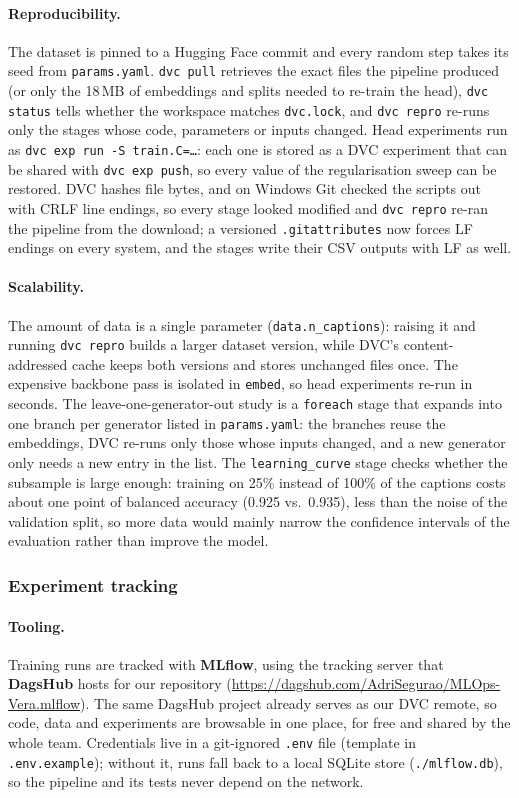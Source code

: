 \documentclass[11pt]{article}
\begin{document}
\paragraph{Reproducibility.} The dataset is pinned to a Hugging Face commit and every random step takes its seed from \texttt{params.yaml}. \texttt{dvc pull} retrieves the exact files the pipeline produced (or only the 18\,MB of embeddings and splits needed to re-train the head), \texttt{dvc status} tells whether the workspace matches \texttt{dvc.lock}, and \texttt{dvc repro} re-runs only the stages whose code, parameters or inputs changed. Head experiments run as \texttt{dvc exp run -S train.C=\ldots}: each one is stored as a DVC experiment that can be shared with \texttt{dvc exp push}, so every value of the regularisation sweep can be restored. DVC hashes file bytes, and on Windows Git checked the scripts out with CRLF line endings, so every stage looked modified and \texttt{dvc repro} re-ran the pipeline from the download; a versioned \texttt{.gitattributes} now forces LF endings on every system, and the stages write their CSV outputs with LF as well.

\paragraph{Scalability.} The amount of data is a single parameter (\texttt{data.n\_captions}): raising it and running \texttt{dvc repro} builds a larger dataset version, while DVC's content-addressed cache keeps both versions and stores unchanged files once. The expensive backbone pass is isolated in \texttt{embed}, so head experiments re-run in seconds. The leave-one-generator-out study is a \texttt{foreach} stage that expands into one branch per generator listed in \texttt{params.yaml}: the branches reuse the embeddings, DVC re-runs only those whose inputs changed, and a new generator only needs a new entry in the list. The \texttt{learning\_curve} stage checks whether the subsample is large enough: training on 25\% instead of 100\% of the captions costs about one point of balanced accuracy (0.925 vs.\ 0.935), less than the noise of the validation split, so more data would mainly narrow the confidence intervals of the evaluation rather than improve the model.

\subsubsection{Experiment tracking}

\paragraph{Tooling.} Training runs are tracked with \textbf{MLflow}, using the tracking server that \textbf{DagsHub} hosts for our repository (\url{https://dagshub.com/AdriSegurao/MLOps-Vera.mlflow}). The same DagsHub project already serves as our DVC remote, so code, data and experiments are browsable in one place, for free and shared by the whole team. Credentials live in a git-ignored \texttt{.env} file (template in \texttt{.env.example}); without it, runs fall back to a local SQLite store (\texttt{./mlflow.db}), so the pipeline and its tests never depend on the network.
\end{document}
